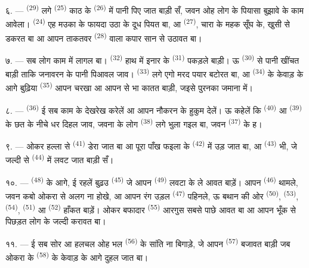 ६. ---  \textsuperscript{(29)} लगे 
\textsuperscript{(25)} काठ के  \textsuperscript{(26)} में पानी
पिए जात बाड़ी सँ, जवन ओह लोग के पियासा बुझावे के काम आवेला।
 \textsuperscript{(24)} एह मउका के फायदा उठा के दूध पियत
बा, आ  \textsuperscript{(27)}, चारा के महक सूँघ के, खुसी से
डकरत बा आ आपन ताकतवर  \textsuperscript{(28)} वाला कपार सान
से उठावत बा।

७. --- सब लोग काम में लागल बा।  \textsuperscript{(32)}
हाथ में इनार के  \textsuperscript{(31)} पकड़ले बाड़ी। ऊ
 \textsuperscript{(30)} से पानी खींचत बाड़ी ताकि जनावरन के
पानी पिआवल जाव।  \textsuperscript{(33)} लगे एगो मरद पयार
बटोरत बा, आ  \textsuperscript{(34)} के केवाड़ के आगे बुढ़िया
 \textsuperscript{(35)} आपन चरखा आ आपन  से
 भा  कातत बाड़ी, जइसे पुरनका जमाना में।

\VUsaut{3.0mm}
\VUsaut{3.0mm}

८. ---  \textsuperscript{(36)} ई सब काम के देखरेख करेलें आ
आपन नौकरन के हुकुम देलें। ऊ कहेलें कि  \textsuperscript{(40)}
आ  \textsuperscript{(39)} के छत के नीचे धर दिहल जाव, जवना
के लोग  \textsuperscript{(38)} लगे भुला गइल बा, जवन
 \textsuperscript{(37)} के ह।

९. --- ओकर हल्ला से  \textsuperscript{(41)} डेरा जात बा आ
पूरा पाँख फइला के  \textsuperscript{(42)} में उड़ जात
बा, आ  \textsuperscript{(43)} भी, जे जल्दी से
 \textsuperscript{(44)} में लवट जात बाड़ी सँ।

१०. ---  \textsuperscript{(48)} के आगे, ई रहलें बुढ़उ
 \textsuperscript{(45)} जे आपन 
\textsuperscript{(49)} लवटा के ले आवत बाड़ें। आपन 
\textsuperscript{(46)} थामले, जवन कबो ओकरा से अलग ना होखे, आ आपन रंग
उड़ल  \textsuperscript{(47)} पहिनले, ऊ बथान की ओर
 \textsuperscript{(50)},  \textsuperscript{(53)},
 \textsuperscript{(54)},  \textsuperscript{(51)}
आ  \textsuperscript{(52)} हाँकत बाड़ें। ओकर बफादार
 \textsuperscript{(55)} आरगुस सबसे पाछे आवत बा आ आपन भूँक
से पिछड़त लोग के जल्दी करावत बा।

११. --- ई सब सोर आ हलचल ओह भल  \textsuperscript{(56)}
के सांति ना बिगाड़े, जे आपन  \textsuperscript{(57)}
बजावत बाड़ी जब ओकरा के  \textsuperscript{(58)} के केवाड़ के
आगे दुहल जात बा।

